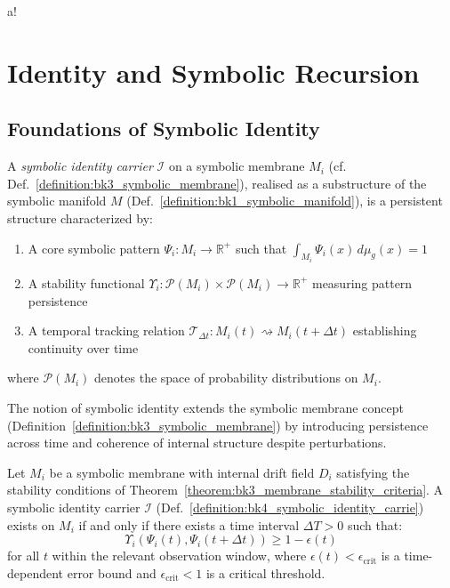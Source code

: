 a!\section{Identity and Symbolic Recursion}
\label{sec:bk4_identity_and_symbolic_recursion}
\subsection{Foundations of Symbolic Identity} \label{subsec:bk4_foundations_symbolic_identity}
\begin{definition}
\label{definition:bk4_symbolic_identity_carrie}
A \emph{symbolic identity carrier} $\mathcal{I}$ on a symbolic membrane $M_i$ (cf. Def.~\ref{definition:bk3_symbolic_membrane}), realised as a substructure of the symbolic manifold $M$ (Def.~\ref{definition:bk1_symbolic_manifold}), is a persistent structure characterized by:
\begin{enumerate}
    \item A core symbolic pattern $\Psi_i : M_i \to \mathbb{R}^+$ such that $\int_{M_i} \Psi_i(x)\, d\mu_g(x) = 1$
    \item A stability functional $\Upsilon_i : \mathcal{P}(M_i) \times \mathcal{P}(M_i) \to \mathbb{R}^+$ measuring pattern persistence
    \item A temporal tracking relation $\mathcal{T}_{\Delta t} : M_i(t) \rightsquigarrow M_i(t+\Delta t)$ establishing continuity over time
\end{enumerate}
where $\mathcal{P}(M_i)$ denotes the space of probability distributions on $M_i$.
\end{definition}
The notion of symbolic identity extends the symbolic membrane concept (Definition~\ref{definition:bk3_symbolic_membrane}) by introducing persistence across time and coherence of internal structure despite perturbations.
\begin{theorem}
\label{theorem:bk4_existence_of_symbolic_ident}
Let $M_i$ be a symbolic membrane with internal drift field $D_i$ satisfying the stability conditions of Theorem~\ref{theorem:bk3_membrane_stability_criteria}. A symbolic identity carrier $\mathcal{I}$ (Def.~\ref{definition:bk4_symbolic_identity_carrie}) exists on $M_i$ if and only if there exists a time interval $\Delta T > 0$ such that:
\begin{equation} \label{eq:bk4_mutual_info_expansion_entropy}
\Upsilon_i(\Psi_i(t), \Psi_i(t+\Delta t)) \geq 1 - \epsilon(t)
\end{equation}
for all $t$ within the relevant observation window, where $\epsilon(t) < \epsilon_{\text{crit}}$ is a time-dependent error bound and $\epsilon_{\text{crit}} < 1$ is a critical threshold.
\end{theorem}
